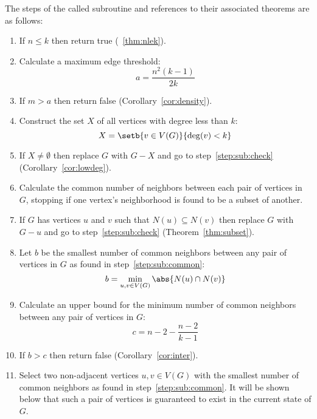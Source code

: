 The steps of the called subroutine and references to their associated theorems are as follows:

\begin{enumerate}
\item \label{step:sub:check} If \(n\le k\) then return true (\theoremname~\ref{thm:nlek}).

\item \label{step:sub:dencalc} Calculate a maximum edge threshold:
  \[a=\frac{n^2(k-1)}{2k}\]

\item \label{step:sub:density} If \(m>a\) then return false (Corollary~\ref{cor:density}).

\item \label{step:sub:smallcalc} Construct the set \(X\) of all vertices with degree less than \(k\):
  \[X=\setb{v\in V(G)}{\deg(v)<k}\]

\item \label{step:sub:small} If \(X\ne\emptyset\) then replace \(G\) with \(G-X\) and go to
  step~\ref{step:sub:check} (Corollary~\ref{cor:lowdeg}).

\item \label{step:sub:common} Calculate the common number of neighbors between each pair of vertices in \(G\),
  stopping if one vertex's neighborhood is found to be a subset of another.

\item \label{step:sub:subset} If \(G\) has vertices \(u\) and \(v\) such that \(N(u)\subseteq N(v)\) then replace
  \(G\) with \(G-u\) and go to step~\ref{step:sub:check} (Theorem~\ref{thm:subset}).

\item \label{step:sub:select} Let \(b\) be the smallest number of common neighbors between any pair of vertices in
  \(G\) as found in step~\ref{step:sub:common}:
  \[b=\min_{u,v\in V(G)}\abs{N(u)\cap N(v)}\]

\item \label{step:sub:ubcalc} Calculate an upper bound for the minimum number of common neighbors between any pair of
  vertices in \(G\):
  \[c=n-2-\frac{n-2}{k-1}\]

\item \label{step:sub:ubcheck} If \(b>c\) then return false (Corollary~\ref{cor:inter}).

\item \label{step:sub:select2} Select two non-adjacent vertices \(u,v\in V(G)\) with the smallest number of common
  neighbors as found in step~\ref{step:sub:common}.  It will be shown below that such a pair of vertices is
  guaranteed to exist in the current state of \(G\).


\end{enumerate}
